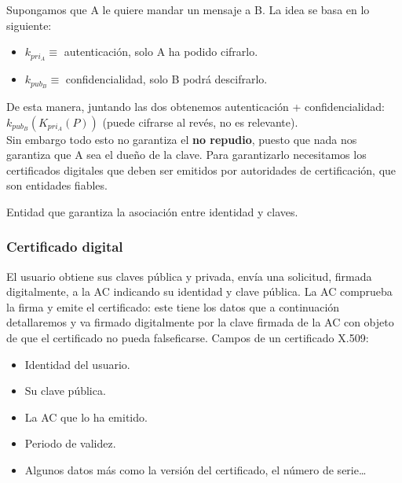 Supongamos que A le quiere mandar un mensaje a B. La idea se basa en lo siguiente:
\begin{itemize}
    \item $k_{pri_A}\equiv$ autenticación, solo A ha podido cifrarlo.
    \item $k_{pub_B}\equiv$ confidencialidad, solo B podrá descifrarlo.
\end{itemize}
De esta manera, juntando las dos obtenemos autenticación + confidencialidad: $k_{pub_B}(K_{pri_A} (P))$ (puede cifrarse al revés, no es relevante).\\

Sin embargo todo esto no garantiza el \textbf{no repudio}, puesto que nada nos garantiza que A sea el dueño de la clave. Para garantizarlo necesitamos los certificados digitales que deben ser emitidos por autoridades de certificación, que son entidades fiables. 

\begin{definicion}
    Entidad que garantiza la asociación entre identidad y claves.
\end{definicion}

\subsubsection{Certificado digital}
El usuario obtiene sus claves pública y privada, envía una solicitud, firmada digitalmente, a la AC indicando su identidad y clave pública. La AC comprueba la firma y emite el certificado: este tiene los datos que a continuación detallaremos y va firmado digitalmente por la clave firmada de la AC con objeto de que el certificado no pueda falseficarse. Campos de un certificado X\@.509:
\begin{itemize}
    \item Identidad del usuario.
    \item Su clave pública.
    \item La AC que lo ha emitido.
    \item Periodo de validez.
    \item Algunos datos más como la versión del certificado, el número de serie\ldots
\end{itemize}

